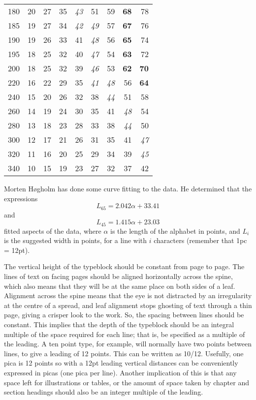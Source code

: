 \documentclass[10pt,letterpaper,extrafontsizes]{memoir}
\begin{document}
\begin{table}
\begin{tabular}{r|rrrrrrrr}
180  & 20 & 27 & 35 & \textit{43} & 51 & 59 & \textbf{68} & 78 \\
185  & 19 & 27 & 34 & \textit{42} & \textit{49} & 57 & \textbf{67} & 76 \\
190  & 19 & 26 & 33 & 41 & \textit{48} & 56 & \textbf{65} & 74 \\
195  & 18 & 25 & 32 & 40 & \textit{47} & 54 & \textbf{63} & 72 \\
200  & 18 & 25 & 32 & 39 & \textit{46} & 53 & \textbf{62} & \textbf{70} \\ 
220  & 16 & 22 & 29 & 35 & \textit{41} & \textit{48} & 56 & \textbf{64} \\
240  & 15 & 20 & 26 & 32 & 38 & \textit{44} & 51 & 58 \\
260  & 14 & 19 & 24 & 30 & 35 & 41 & \textit{48} & 54 \\
280  & 13 & 18 & 23 & 28 & 33 & 38 & \textit{44} & 50 \\
300  & 12 & 17 & 21 & 26 & 31 & 35 & 41 & \textit{47} \\
320  & 11 & 16 & 20 & 25 & 29 & 34 & 39 & \textit{45} \\
340  & 10 & 15 & 19 & 23 & 27 & 32 & 37 & 42 \\
\hline
\end{tabular}
\end{table}

    Morten H{\o}gholm has done some curve fitting
to the data. He determined that the expressions
\begin{equation}
L_{65} = 2.042\alpha + 33.41 \label{eq:L65}
\end{equation}
and
\begin{equation}
L_{45} = 1.415\alpha + 23.03 \label{eq:L45}
\end{equation}
fitted aspects of the data, where $\alpha$ is the length of the alphabet
in points, and $L_{i}$ is the suggested width in points, for a line with
$i$ characters (remember that 1pc = 12pt).

   The vertical height of the typeblock should be constant from page to
page. The lines of text on facing pages should be aligned
horizontally across the spine, which also means that they will be at
the same place on both sides of a leaf. Alignment across the spine
means that the eye is not distracted by an irregularity at the centre
of a spread, and leaf alignment stops ghosting of text through a thin page,
giving a crisper look to the work. 
So, the spacing between lines should
be constant. This implies that the depth of the typeblock should be an
integral multiple of the space required for each line; that is, be specified
as a multiple of the leading. A ten point type, for example, will normally
have two points between lines, to give a leading of 12 points. This can be
written as 10/12. Usefully, one pica is 12 points so with a 12pt leading
vertical distances can be conveniently expressed in picas 
(one pica per line). Another implication of this is that any space left 
for illustrations or tables, or
the amount of space taken by chapter and section headings 
should also be
an integer multiple of the leading.
\end{document}
